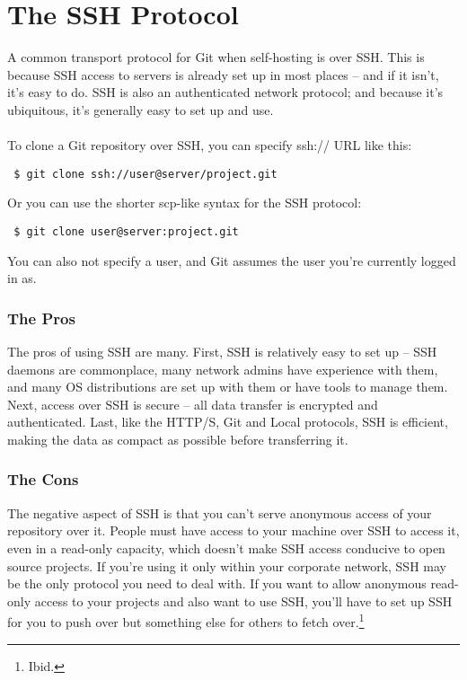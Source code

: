 \documentclass[12pt,letterpaper,dvips]{article}
\begin{document}
\newpage
\section{The SSH Protocol}
A common transport protocol for Git when self-hosting is over SSH.
This is because SSH access to servers is already set up in most
places – and if it isn’t, it's easy to do.  SSH is also an
authenticated network protocol; and because it’s ubiquitous,
it's generally easy to set up and use.
\\
\\
To clone a Git repository over SSH, you can specify ssh:// URL like this:

\begin{Verbatim}
 $ git clone ssh://user@server/project.git
\end{Verbatim}

\noindent Or you can use the shorter scp-like syntax for the SSH
protocol:

\begin{Verbatim}
 $ git clone user@server:project.git
\end{Verbatim}

\noindent You can also not specify a user, and Git assumes the
user you’re currently logged in as.


\subsubsection{The Pros}
The pros of using SSH are many.  First, SSH is relatively easy
to set up – SSH daemons are commonplace, many network admins have
experience with them, and many OS distributions are set up with
them or have tools to manage them.  Next, access over SSH is
secure – all data transfer is encrypted and authenticated.  Last,
like the HTTP/S, Git and Local protocols, SSH is efficient, making
the data as compact as possible before transferring it.


\subsubsection{The Cons}
The negative aspect of SSH is that you can’t serve anonymous
access of your repository over it.  People must have access to
your machine over SSH to access it, even in a read-only capacity,
which doesn’t make SSH access conducive to open source projects.
If you’re using it only within your corporate network, SSH may be
the only protocol you need to deal with.  If you want to allow
anonymous read-only access to your projects and also want to use
SSH, you’ll have to set up SSH for you to push over but something
else for others to fetch over.\footnote{Ibid.}
\end{document}
